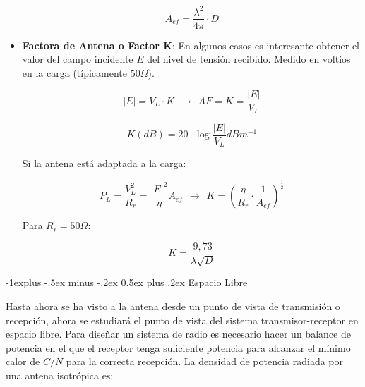 \documentclass[10pt,portrait, twocolumn]{article}
\makeatletter
\renewcommand{\subsection}{\@startsection{subsection}{2}{0mm}%
                                {-1explus -.5ex minus -.2ex}%
                                {0.5ex plus .2ex}%
                                {\normalfont\normalsize\bfseries}}
\makeatother
\begin{document}
\begin{itemize}
				\begin{equation*}
				A_{ef} = \frac{\lambda^{2}}{4 \pi} \cdot D
				\end{equation*}
				
		\item \textbf{Factora de Antena o Factor K}: En algunos casos es interesante obtener el valor del campo incidente $E$ del nivel de tensión recibido. Medido en voltios en la carga (típicamente $50 \Omega$).
		
			\begin{equation*}
			|E| = V_{L} \cdot K \hspace{5pt} \rightarrow \hspace{5pt} AF = K = \frac{|E|}{V_{L}}
			\end{equation*}
			
			\begin{equation*}
			K(dB) = 20 \cdot \log \frac{|E|}{V_{L}} dBm^{-1}
			\end{equation*}
			
			Si la antena está adaptada a la carga:
			
			\begin{equation*}
			P_{L} = \frac{V_{L}^{2}}{R_{r}} = \frac{|E|^{2}}{\eta} A_{ef} \hspace{5pt} \rightarrow \hspace{5pt} K = \left( \frac{\eta}{R_{r}} \cdot \frac{1}{A_{ef}} \right)^{\frac{1}{2}}
			\end{equation*}
			
			Para $R_{r} = 50 \Omega$:
			
				\begin{equation*}
				K = \frac{9,73}{\lambda \sqrt{D}}
				\end{equation*}
		
	\end{itemize}

\subsection{Espacio Libre}

Hasta ahora se ha visto a la antena desde un punto de vista de transmisión o recepción, ahora se estudiará el punto de vista del sistema transmisor-receptor en espacio libre. Para diseñar un sistema de radio es necesario hacer un balance de potencia en el que el receptor tenga suficiente potencia para alcanzar el mínimo calor de $C/N$ para la correcta recepción. La densidad de potencia radiada por una antena isotrópica es:
\end{document}

